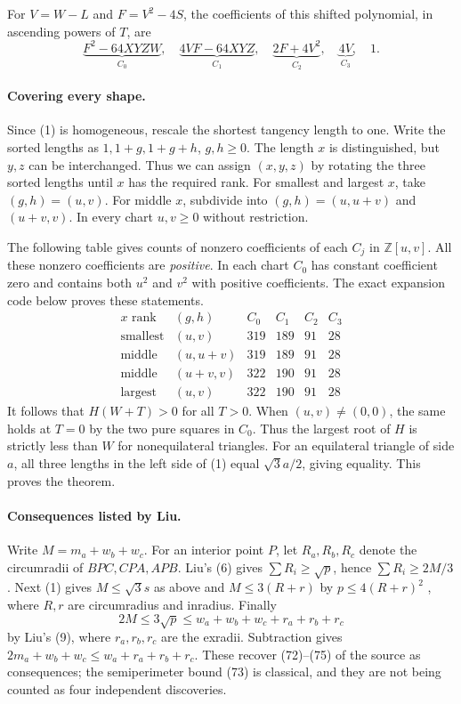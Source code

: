 \documentclass[11pt,a4paper]{article}
\numberwithin{equation}{section}
\theoremstyle{definition}
\theoremstyle{remark}
\begin{document}
For $V=W-L$ and $F=V^2-4S$, the coefficients of this shifted polynomial, in ascending powers of $T$, are
\[
 \underbrace{F^2-64XYZW}_{C_0},\quad
 \underbrace{4VF-64XYZ}_{C_1},\quad
 \underbrace{2F+4V^2}_{C_2},\quad
 \underbrace{4V}_{C_3},\quad 1. \tag{4}
\]

\paragraph{Covering every shape.}
Since (1) is homogeneous, rescale the shortest tangency length to one. Write the sorted lengths as $1,1+g,1+g+h$, $g,h\ge0$. The length $x$ is distinguished, but $y,z$ can be interchanged. Thus we can assign $(x,y,z)$ by rotating the three sorted lengths until $x$ has the required rank. For smallest and largest $x$, take $(g,h)=(u,v)$. For middle $x$, subdivide into $(g,h)=(u,u+v)$ and $(u+v,v)$. In every chart $u,v\ge0$ without restriction.

The following table gives counts of nonzero coefficients of each $C_j$ in $\mathbb{Z}[u,v]$. All these nonzero coefficients are \emph{positive}. In each chart $C_0$ has constant coefficient zero and contains both $u^2$ and $v^2$ with positive coefficients. The exact expansion code below proves these statements.
\[
\begin{array}{c|c|rrrr}
 x\text{ rank}&(g,h)&C_0&C_1&C_2&C_3\\\hline
\text{smallest}&(u,v)&319&189&91&28\\
\text{middle}&(u,u+v)&319&189&91&28\\
\text{middle}&(u+v,v)&322&190&91&28\\
\text{largest}&(u,v)&322&190&91&28
\end{array}
\]
It follows that $H(W+T)>0$ for all $T>0$. When $(u,v)\ne(0,0)$, the same holds at $T=0$ by the two pure squares in $C_0$. Thus the largest root of $H$ is strictly less than $W$ for nonequilateral triangles. For an equilateral triangle of side $a$, all three lengths in the left side of (1) equal $\sqrt3 a/2$, giving equality. This proves the theorem.

\paragraph{Consequences listed by Liu.}
Write $M=m_a+w_b+w_c$. For an interior point $P$, let $R_a,R_b,R_c$ denote the circumradii of $BPC,CPA,APB$. Liu's (6) gives $\sum R_i\ge\sqrt p$, hence $\sum R_i\ge 2M/3$. Next (1) gives $M\le\sqrt3s$ as above and $M\le3(R+r)$ by $p\le4(R+r)^2$ \cite[Eq.~(62)]{r40meiji:liu}, where $R,r$ are circumradius and inradius. Finally
\[
  2M\le 3\sqrt p\le w_a+w_b+w_c+r_a+r_b+r_c
\]
by Liu's (9), where $r_a,r_b,r_c$ are the exradii. Subtraction gives $2m_a+w_b+w_c\le w_a+r_a+r_b+r_c$. These recover (72)--(75) of the source as consequences; the semiperimeter bound (73) is classical, and they are not being counted as four independent discoveries.
\end{document}
